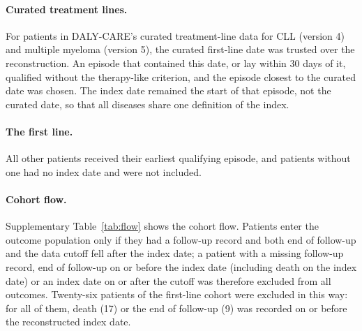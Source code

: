 \documentclass[10pt]{article}
\begin{document}
\paragraph{Curated treatment lines.} For patients in DALY-CARE's curated
treatment-line data for CLL (version 4) and multiple myeloma (version 5), the
curated first-line date was trusted over the reconstruction. An episode that
contained this date, or lay within 30 days of it, qualified without the
therapy-like criterion, and the episode closest to the curated date was chosen.
The index date remained the start of that episode, not the curated date, so
that all diseases share one definition of the index.

\paragraph{The first line.} All other patients received their earliest
qualifying episode, and patients without one had no index date and were not
included.

\paragraph{Cohort flow.} Supplementary Table~\ref{tab:flow} shows the cohort
flow. Patients enter the outcome population only if they had a follow-up record
and both end of follow-up and the data cutoff fell after the index date; a
patient with a missing follow-up record, end of follow-up on or before the
index date (including death on the index date) or an index date on or after
the cutoff was therefore excluded from all outcomes. Twenty-six patients of the
first-line cohort were excluded in this way: for all of them, death (17) or the
end of follow-up (9) was recorded on or before the reconstructed index date.
\end{document}
